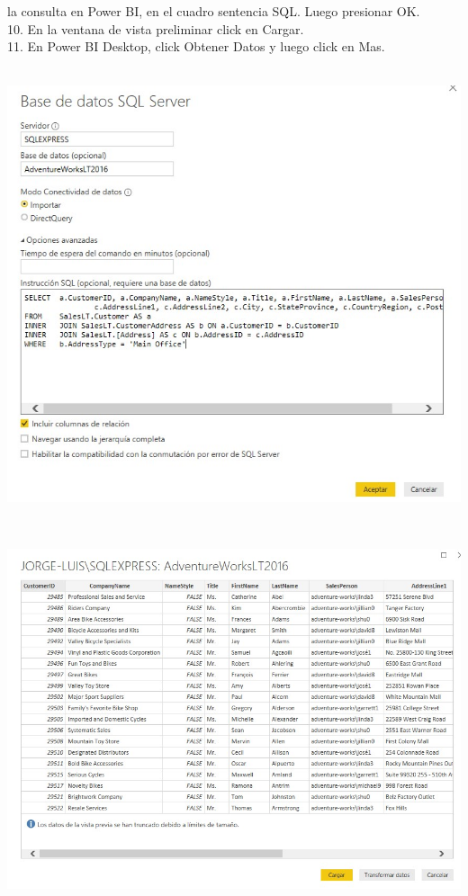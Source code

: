 \documentclass[12pt,letterpaper]{article}
\begin{document}
\begin{flushleft}
\begin{itemize}
la consulta en Power BI, en el cuadro sentencia SQL. Luego presionar OK.\\
10. En la ventana de vista preliminar click en Cargar.\\
11. En Power BI Desktop, click Obtener Datos y luego click en Mas.\\
\textbf{ }\\
\begin{center}
	\includegraphics[width=15cm]{./Imagenes/image4} 
	\end{center}
\textbf{ }\\
\begin{center}
	\includegraphics[width=16cm]{./Imagenes/image5} 

\end{center}
\end{itemize}
\end{flushleft}
\end{document}
